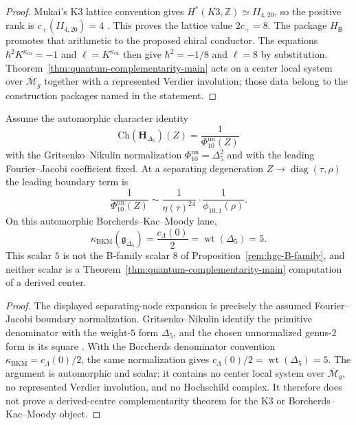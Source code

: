 \begin{proof}
Mukai's K3 lattice convention gives
$H^*(K3,\mathbb Z)\simeq II_{4,20}$, so the positive rank is
$c_+(II_{4,20})=4$ \cite{Mukai1987}.  This proves the lattice value
$2c_+=8$.  The package $H_{\mathsf B}$ promotes that arithmetic to the
proposed chiral conductor.  The equations
$\hbar^2K^{\kappa_{\mathrm{ch}}}=-1$ and
$\ell=K^{\kappa_{\mathrm{ch}}}$ then give $\hbar^2=-1/8$ and
$\ell=8$ by substitution.  Theorem~\ref{thm:quantum-complementarity-main}
acts on a center local system over $\overline{\mathcal M}_g$ together
with a represented Verdier involution; those data belong to the
construction packages named in the statement.
\end{proof}

\begin{proposition}
\label{rem:hgc-sepnode}
Assume the automorphic character identity
\[
  \mathrm{Ch}(\mathbf H_{\Delta_5})(Z)
  =\frac{1}{\Phi_{10}^{\mathrm{un}}(Z)}
\]
with the Gritsenko--Nikulin normalization
$\Phi_{10}^{\mathrm{un}}=\Delta_5^2$ and with the leading
Fourier--Jacobi coefficient fixed. At a separating degeneration
$Z\to\operatorname{diag}(\tau,\rho)$ the leading boundary term is
\[
  \frac{1}{\Phi_{10}^{\mathrm{un}}(Z)}
  \sim
  \frac{1}{\eta(\tau)^{24}}\cdot\frac{1}{\phi_{10,1}(\rho)}.
\]
On this automorphic Borcherds--Kac--Moody lane,
\[
  \kappa_{\mathrm{BKM}}(\mathfrak g_{\Delta_5})
  =\frac{c_\Lambda(0)}{2}
  =\operatorname{wt}(\Delta_5)
  =5.
\]
This scalar $5$ is not the B-family scalar $8$ of
Proposition~\ref{rem:hgc-B-family}, and neither scalar is a
Theorem~\ref{thm:quantum-complementarity-main} computation of a
derived center.
\end{proposition}

\begin{proof}
The displayed separating-node expansion is precisely the assumed
Fourier--Jacobi boundary normalization. Gritsenko--Nikulin identify the
primitive denominator with the weight-$5$ form $\Delta_5$, and the
chosen unnormalized genus-$2$ form is its square
\cite{GritsenkoNikulin1998}. With the Borcherds denominator convention
$\kappa_{\mathrm{BKM}}=c_\Lambda(0)/2$, the same normalization gives
$c_\Lambda(0)/2=\operatorname{wt}(\Delta_5)=5$. The argument is
automorphic and scalar: it contains no center local system over
$\overline{\mathcal M}_g$, no represented Verdier involution, and no
Hochschild complex. It therefore does not prove a derived-centre
complementarity theorem for the K3 or Borcherds--Kac--Moody object.
\end{proof}
